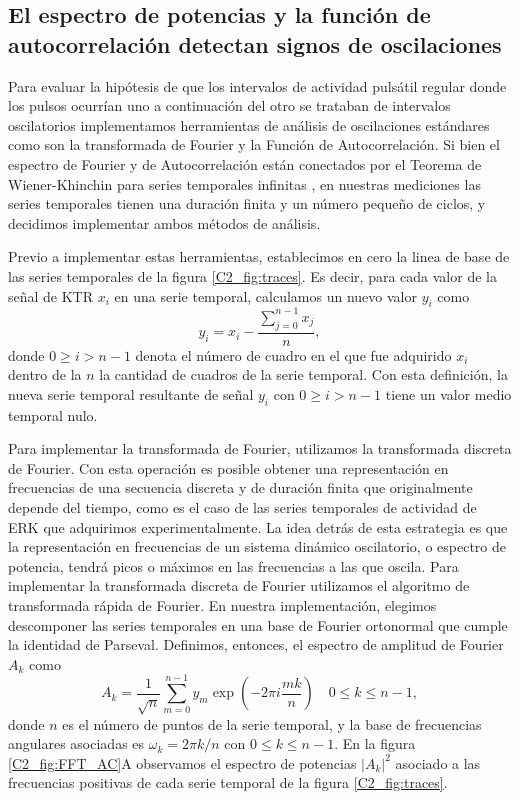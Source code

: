 \documentclass[./main.tex]{subfiles}
\begin{document}
\subsection{El espectro de potencias y la función de autocorrelación detectan signos de oscilaciones}


Para evaluar la hipótesis de que los intervalos de actividad pulsátil regular donde los pulsos ocurrían uno a continuación del otro se trataban de intervalos oscilatorios implementamos herramientas de análisis de oscilaciones estándares como son la transformada de Fourier y la Función de Autocorrelación. Si bien el espectro de Fourier y de Autocorrelación están conectados por el Teorema de Wiener-Khinchin para series temporales infinitas \cite{Gardiner}, en nuestras mediciones las series temporales tienen una duración finita y un número pequeño de ciclos, y decidimos implementar ambos métodos de análisis. 


Previo a implementar estas herramientas, establecimos en cero la linea de base de las series temporales de la figura \ref{C2_fig:traces}. Es decir, para cada valor de la señal de KTR $x_i$ en una serie temporal, calculamos un nuevo valor $y_i$ como
\begin{equation}
    y_i = x_i - \frac{\sum_{j=0}^{n-1} x_j}{n},
    \label{C2_eq:base_cero}
\end{equation}
donde $0 \geq i > n-1$ denota el número de cuadro en el que fue adquirido $x_i$ dentro de la $n$ la cantidad de cuadros de la serie temporal. Con esta definición, la nueva serie temporal resultante de señal $y_i$ con $0 \geq i > n-1$ tiene un valor medio temporal nulo.


Para implementar la transformada de Fourier, utilizamos la transformada discreta de Fourier. Con esta operación es posible obtener una representación en frecuencias de una secuencia discreta y de duración finita que originalmente depende del tiempo, como es el caso de las series temporales de actividad de ERK que adquirimos experimentalmente. La idea detrás de esta estrategia es que la representación en frecuencias de un sistema dinámico oscilatorio, o espectro de potencia, tendrá picos o máximos en las frecuencias a las que oscila. Para implementar la transformada discreta de Fourier utilizamos el algoritmo de transformada rápida de Fourier. En nuestra implementación, elegimos descomponer las series temporales en una base de Fourier ortonormal que cumple la identidad de Parseval. Definimos, entonces, el espectro de amplitud de Fourier $A_k$ como \cite{Harris2020}
\begin{equation}
   A_k = \frac{1}{\sqrt{n}} \sum_{m=0}^{n-1} y_m \exp{(-2\pi i \frac{mk}{n})} \quad 0 \leq k \leq n-1,
   \label{C2_eq:amplitud_fourier}
\end{equation}
donde $n$ es el número de puntos de la serie temporal, y la base de frecuencias angulares asociadas es $\omega_k = 2\pi k/n$ con $0 \leq k \leq n-1$. En la figura \ref{C2_fig:FFT_AC}A observamos el espectro de potencias $|A_k|^2$ asociado a las frecuencias positivas de cada serie temporal de la figura \ref{C2_fig:traces}. 
\end{document}
